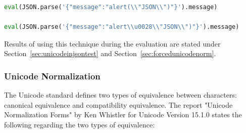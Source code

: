 \begin{lstlisting}[style=basicStyle, language=Python]
eval(JSON.parse('{"message":"alert(\\"JSON\\")"}').message)

eval(JSON.parse('{"message":"alert\\u0028\\"JSON\\")"}').message)
\end{lstlisting}
Results of using this technique during the evaluation are stated under Section~\ref{sec:unicodeinjsontest} and Section~\ref{sec:forcedunicodenorm}.


\subsubsection{Unicode Normalization}
\label{sec:unicodenormalization}
The Unicode standard defines two types of equivalence between characters: canonical equivalence and compatibility equivalence. The report "Unicode Normalization Forms" by Ken Whistler for Unicode Version 15.1.0 states the following regarding the two types of equivalence:

